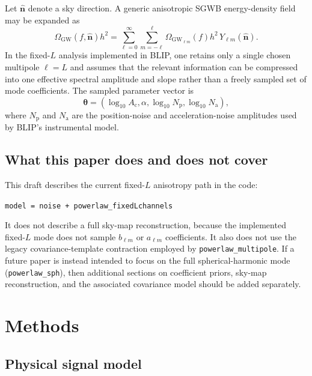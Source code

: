\documentclass[11pt]{article}
\newcommand{\Om}{\Omega_{\mathrm{GW}}}
\newcommand{\vect}[1]{\bm{#1}}
\begin{document}
Let $\hat{\vect{n}}$ denote a sky direction. A generic anisotropic SGWB energy-density field may be expanded as
\begin{equation}
  \Om(f,\hat{\vect{n}}) h^2
  =
  \sum_{\ell=0}^{\infty}
  \sum_{m=-\ell}^{\ell}
  \Om_{\ell m}(f) h^2 \, Y_{\ell m}(\hat{\vect{n}}).
\end{equation}
In the fixed-$L$ analysis implemented in BLIP, one retains only a single chosen multipole $\ell=L$ and assumes that the relevant information can be compressed into one effective spectral amplitude and slope rather than a freely sampled set of mode coefficients. The sampled parameter vector is
\begin{equation}
  \vect{\theta}
  =
  \left(
    \log_{10} A_{\mathrm{c}},
    \alpha,
    \log_{10} N_{\mathrm{p}},
    \log_{10} N_{\mathrm{a}}
  \right),
  \label{eq:theta-definition}
\end{equation}
where $N_{\mathrm{p}}$ and $N_{\mathrm{a}}$ are the position-noise and acceleration-noise amplitudes used by BLIP's instrumental model.

\subsection{What this paper does and does not cover}

This draft describes the current fixed-$L$ anisotropy path in the code:
\begin{center}
\texttt{model = noise + powerlaw\_fixedLchannels}
\end{center}
It does not describe a full sky-map reconstruction, because the implemented fixed-$L$ mode does not sample $b_{\ell m}$ or $a_{\ell m}$ coefficients. It also does not use the legacy covariance-template contraction employed by \texttt{powerlaw\_multipole}. If a future paper is instead intended to focus on the full spherical-harmonic mode (\texttt{powerlaw\_sph}), then additional sections on coefficient priors, sky-map reconstruction, and the associated covariance model should be added separately.

\section{Methods}

\subsection{Physical signal model}
\end{document}

